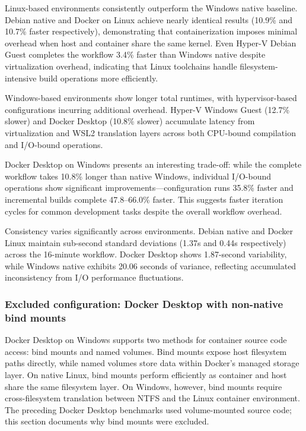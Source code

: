 Linux-based environments consistently outperform the Windows native baseline.
Debian native and Docker on Linux achieve nearly identical results (10.9\% and 10.7\% faster respectively), demonstrating that containerization imposes minimal overhead when host and container share the same kernel.
Even Hyper-V Debian Guest completes the workflow 3.4\% faster than Windows native despite virtualization overhead, indicating that Linux toolchains handle filesystem-intensive build operations more efficiently.

Windows-based environments show longer total runtimes, with hypervisor-based configurations incurring additional overhead.
Hyper-V Windows Guest (12.7\% slower) and Docker Desktop (10.8\% slower) accumulate latency from virtualization and WSL2 translation layers across both CPU-bound compilation and I/O-bound operations.

Docker Desktop on Windows presents an interesting trade-off: while the complete workflow takes 10.8\% longer than native Windows, individual I/O-bound operations show significant improvements---configuration runs 35.8\% faster and incremental builds complete 47.8--66.0\% faster.
This suggests faster iteration cycles for common development tasks despite the overall workflow overhead.

Consistency varies significantly across environments.
Debian native and Docker Linux maintain sub-second standard deviations (1.37s and 0.44s respectively) across the 16-minute workflow.
Docker Desktop shows 1.87-second variability, while Windows native exhibits 20.06 seconds of variance, reflecting accumulated inconsistency from I/O performance fluctuations.

\subsubsection{Excluded configuration: Docker Desktop with non-native bind mounts}
\label{subsec:excluded_bind_mounts}

Docker Desktop on Windows supports two methods for container source code access: bind mounts and named volumes.
Bind mounts expose host filesystem paths directly, while named volumes store data within Docker's managed storage layer.
On native Linux, bind mounts perform efficiently as container and host share the same filesystem layer.
On Windows, however, bind mounts require cross-filesystem translation between NTFS and the Linux container environment.
The preceding Docker Desktop benchmarks used volume-mounted source code; this section documents why bind mounts were excluded.

